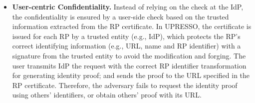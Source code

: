 \begin{itemize}
\item \textbf{User-centric Confidentiality.}
Instead of relying on the check at the IdP, the confidentiality is ensured by a user-side check based on the trusted information extracted from the RP certificate.
In UPRESSO, the certificate is issued for each RP by a trusted entity (e.g., IdP), which protects the RP's correct identifying information (e.g., URL, name and RP identifier)
 with a signature from the trusted entity to avoid the modification and forging.
The user transmits IdP the request with the correct RP identifier  transformation for generating identity proof; and sends the proof to the URL specified in the RP certificate.
Therefore, the adversary fails to request the identity proof using others' identifiers, or obtain others' proof with its URL.
\end{itemize}

